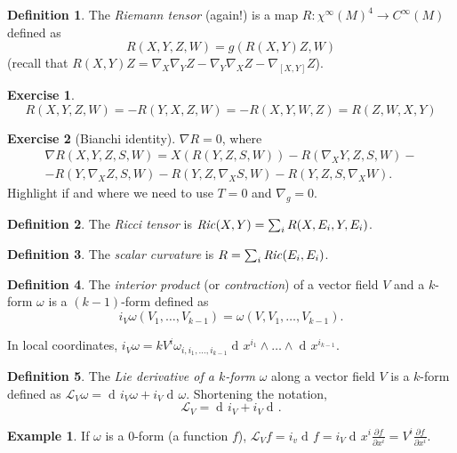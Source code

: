 \documentclass[a4paper,12pt]{book}
\newcommand{\dd}{\mathop{\mathrm{d}\!}{}}
\theoremstyle{definition}
\newtheorem{definition}{Definition}
\newtheorem{example}{Example}
\newtheorem{exercise}{Exercise}
\theoremstyle{remark}
\begin{document}
\begin{definition}
The \emph{Riemann tensor} (again!) is a map $R\colon\chi^\infty(M)^4\to C^\infty(M)$ defined as
\[R(X,Y,Z,W)=g(R(X,Y)Z,W)\]
(recall that $R(X,Y)Z=\nabla_X\nabla_YZ-\nabla_Y\nabla_XZ-\nabla_{[X,Y]}Z$).
\end{definition}

\begin{exercise}
\[R(X,Y,Z,W)=-R(Y,X,Z,W)=-R(X,Y,W,Z)=R(Z,W,X,Y)\]
\label{riemannsymmetries}
\end{exercise}

\begin{exercise}[Bianchi identity]
$\nabla R=0$, where
\begin{multline*}
\nabla R(X,Y,Z,S,W)=X(R(Y,Z,S,W))-R(\nabla_XY,Z,S,W)-\\
-R(Y,\nabla_XZ,S,W)-R(Y,Z,\nabla_XS,W)-R(Y,Z,S,\nabla_XW).\end{multline*}
Highlight if and where we need to use $T=0$ and $\nabla_g=0$.
\end{exercise}

\begin{definition}
The \emph{Ricci tensor} is $\text{\emph{Ric}}(X,Y)=\sum_i R(X,E_i,Y,E_i)$.
\end{definition}

\begin{definition}
The \emph{scalar curvature} is $R=\sum_i \text{\emph{Ric}}(E_i,E_i)$.
\end{definition}

\begin{definition}
The \emph{interior product} (or \emph{contraction}) of a vector field $V$ and a $k$-form $\omega$ is a $(k-1)$-form defined as
\[i_V\omega(V_1,\ldots,V_{k-1})=\omega(V,V_1,\ldots,V_{k-1}).\]
\end{definition}

In local coordinates, $i_V\omega=kV^i\omega_{i,i_1,\ldots,i_{k-1}}\dd x^{i_1}\wedge\ldots\wedge\dd x^{i_{k-1}}$.

\begin{definition}
The \emph{Lie derivative of a $k$-form} $\omega$ along a vector field $V$ is a $k$-form defined as $\mathcal L_V\omega=\dd i_V\omega+i_V\dd\omega$. Shortening the notation,
\[\mathcal L_V=\dd i_V+i_V\dd.\]
\end{definition}

\begin{example}
If $\omega$ is a 0-form (a function $f$), $\mathcal L_Vf=i_v\dd f=i_V\dd x^i\frac{\partial f}{\partial x^i}=V^i\frac{\partial f}{\partial x^i}.$
\end{example}
\end{document}
